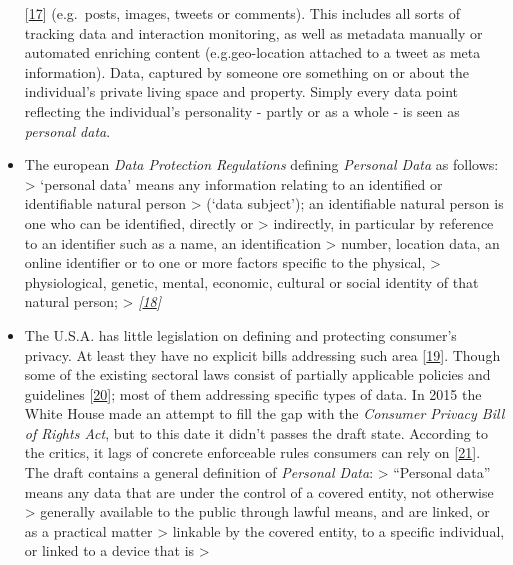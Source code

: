 \documentclass[12pt,english,a4paper,titlepage,cleardoublepage=empty,dottedtoc]{report}
\begin{document}
\begin{itemize}
  {[}\protect\hyperlink{ref-web_2016_wikipedia_intellectual-property}{17}{]}
  (e.g.~posts, images, tweets or comments). This includes all sorts of
  tracking data and interaction monitoring, as well as metadata manually
  or automated enriching content (e.g.geo-location attached to a tweet
  as meta information). Data, captured by someone ore something on or
  about the individual's private living space and property. Simply every
  data point reflecting the individual's personality - partly or as a
  whole - is seen as \emph{personal data}.
\item
  The european \emph{Data Protection Regulations} defining
  \emph{Personal Data} as follows: \textgreater{} `personal data' means
  any information relating to an identified or identifiable natural
  person \textgreater{} (`data subject'); an identifiable natural person
  is one who can be identified, directly or \textgreater{} indirectly,
  in particular by reference to an identifier such as a name, an
  identification \textgreater{} number, location data, an online
  identifier or to one or more factors specific to the physical,
  \textgreater{} physiological, genetic, mental, economic, cultural or
  social identity of that natural person; \textgreater{}
  \emph{{[}\protect\hyperlink{ref-regulation_2016_eu_general-data-protection-regulation_definition}{18}{]}}
\item
  The U.S.A. has little legislation on defining and protecting
  consumer's privacy. At least they have no explicit bills addressing
  such area
  {[}\protect\hyperlink{ref-web_2016_wikipedia_information-privacy-law_us}{19}{]}.
  Though some of the existing sectoral laws consist of partially
  applicable policies and guidelines
  {[}\protect\hyperlink{ref-web_2016_data-protection-laws-in-the-us}{20}{]};
  most of them addressing specific types of data. In 2015 the White
  House made an attempt to fill the gap with the \emph{Consumer Privacy
  Bill of Rights Act}, but to this date it didn't passes the draft
  state. According to the critics, it lags of concrete enforceable rules
  consumers can rely on
  {[}\protect\hyperlink{ref-web_2015_white-house-releases-consumer-privacy-bill-draft}{21}{]}.
  The draft contains a general definition of \emph{Personal Data}:
  \textgreater{} ``Personal data'' means any data that are under the
  control of a covered entity, not otherwise \textgreater{} generally
  available to the public through lawful means, and are linked, or as a
  practical matter \textgreater{} linkable by the covered entity, to a
  specific individual, or linked to a device that is \textgreater{}

\end{itemize}
\end{document}
